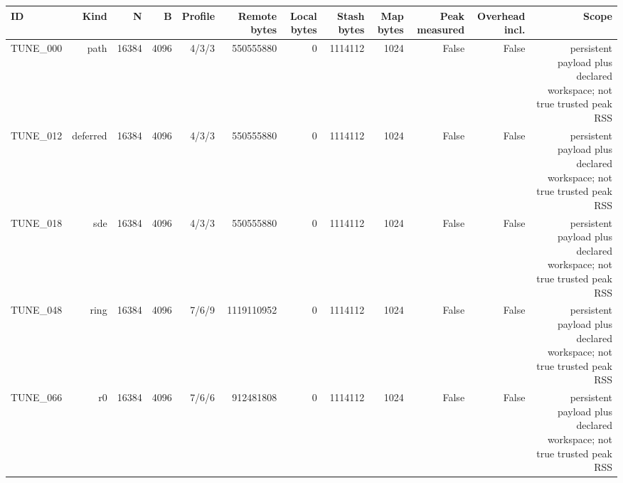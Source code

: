 \begin{tabular}{lrrrrrrrrrrr}
\toprule
ID & Kind & N & B & Profile & Remote bytes & Local bytes & Stash bytes & Map bytes & Peak measured & Overhead incl. & Scope \\
\midrule
TUNE\_000 & path & 16384 & 4096 & 4/3/3 & 550555880 & 0 & 1114112 & 1024 & False & False & persistent payload plus declared workspace; not true trusted peak RSS \\
TUNE\_012 & deferred & 16384 & 4096 & 4/3/3 & 550555880 & 0 & 1114112 & 1024 & False & False & persistent payload plus declared workspace; not true trusted peak RSS \\
TUNE\_018 & sde & 16384 & 4096 & 4/3/3 & 550555880 & 0 & 1114112 & 1024 & False & False & persistent payload plus declared workspace; not true trusted peak RSS \\
TUNE\_048 & ring & 16384 & 4096 & 7/6/9 & 1119110952 & 0 & 1114112 & 1024 & False & False & persistent payload plus declared workspace; not true trusted peak RSS \\
TUNE\_066 & r0 & 16384 & 4096 & 7/6/6 & 912481808 & 0 & 1114112 & 1024 & False & False & persistent payload plus declared workspace; not true trusted peak RSS \\
\bottomrule
\end{tabular}

